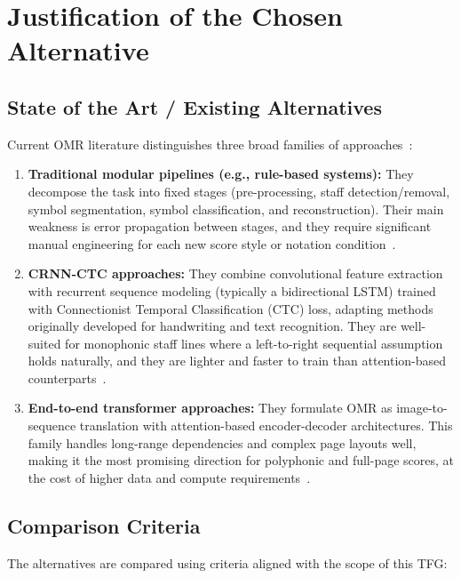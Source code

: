 \documentclass[11pt, a4paper]{article}
\begin{document}
\section{Justification of the Chosen Alternative}

\subsection{State of the Art / Existing Alternatives}
Current OMR literature distinguishes three broad families of approaches~\cite{shatriOPTICALMUSICRECOGNITION}:

\begin{enumerate}
    \item \textbf{Traditional modular pipelines (e.g., rule-based systems):} They decompose the task into fixed stages (pre-processing, staff detection/removal, symbol segmentation, symbol classification, and reconstruction). Their main weakness is error propagation between stages, and they require significant manual engineering for each new score style or notation condition~\cite{dalitzComparativeStudyStaff2008}.
    \item \textbf{CRNN-CTC approaches:} They combine convolutional feature extraction with recurrent sequence modeling (typically a bidirectional LSTM) trained with Connectionist Temporal Classification (CTC) loss, adapting methods originally developed for handwriting and text recognition. They are well-suited for monophonic staff lines where a left-to-right sequential assumption holds naturally, and they are lighter and faster to train than attention-based counterparts~\cite{PrIMuSDataset,opticalmusicrecognitionresearchSelfLearningOpticalMusic2019,simonettaOpticalMusicRecognition2024}.
    \item \textbf{End-to-end transformer approaches:} They formulate OMR as image-to-sequence translation with attention-based encoder-decoder architectures. This family handles long-range dependencies and complex page layouts well, making it the most promising direction for polyphonic and full-page scores, at the cost of higher data and compute requirements~\cite{vilaAntoniorv6SMT2026,UfalOlimpicicdar24Practical,simonettaOpticalMusicRecognition2024}.
\end{enumerate}

\subsection{Comparison Criteria}
The alternatives are compared using criteria aligned with the scope of this TFG:
\end{document}
